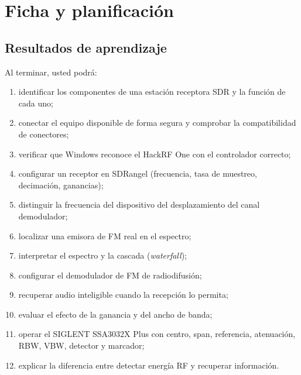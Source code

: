 

\section{Ficha y planificación}
\label{sec:w-plan}

\subsection{Resultados de aprendizaje}

Al terminar, usted podrá:
\begin{enumerate}
  \item identificar los componentes de una estación receptora SDR y la función de cada uno;
  \item conectar el equipo disponible de forma segura y comprobar la compatibilidad de conectores;
  \item verificar que Windows reconoce el HackRF One con el controlador correcto;
  \item configurar un receptor en SDRangel (frecuencia, tasa de muestreo, decimación, ganancias);
  \item distinguir la frecuencia del dispositivo del desplazamiento del canal demodulador;
  \item localizar una emisora de FM real en el espectro;
  \item interpretar el espectro y la cascada (\emph{waterfall});
  \item configurar el demodulador de FM de radiodifusión;
  \item recuperar audio inteligible cuando la recepción lo permita;
  \item evaluar el efecto de la ganancia y del ancho de banda;
  \item operar el SIGLENT SSA3032X Plus con centro, span, referencia, atenuación, RBW, VBW, detector y marcador;
  \item explicar la diferencia entre detectar energía RF y recuperar información.
\end{enumerate}

